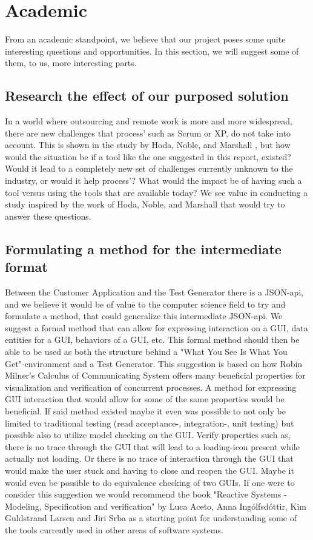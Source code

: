 \section{Academic}
From an academic standpoint, we believe that our project poses some quite interesting questions and opportunities.
In this section, we will suggest some of them, to us, more interesting parts.

\subsection{Research the effect of our purposed solution}
In a world where outsourcing and remote work is more and more widespread, there are new challenges that process' such as Scrum or XP, do not take into account.
This is shown in the study by Hoda, Noble, and Marshall \cite{Hoda2011TheIO}, but how would the situation be if a tool like the one suggested in this report, existed?
Would it lead to a completely new set of challenges currently unknown to the industry, or would it help process'?
What would the impact be of having such a tool versus using the tools that are available today?
We see value in conducting a study inspired by the work of Hoda, Noble, and Marshall that would try to answer these questions.

\subsection{Formulating a method for the intermediate format}
Between the Customer Application and the Test Generator there is a JSON-api, and we believe it would be of value to the computer science field to try and formulate a method, that could generalize this intermediate JSON-api.
We suggest a formal method that can allow for expressing interaction on a GUI, data entities for a GUI, behaviors of a GUI, etc.
This formal method should then be able to be used as both the structure behind a "What You See Is What You Get"-environment and a Test Generator.
This suggestion is based on how Robin Milner's Calculus of Communicating System offers many beneficial properties for visualization and verification of concurrent processes.
A method for expressing GUI interaction that would allow for some of the same properties would be beneficial.
If said method existed maybe it even was possible to not only be limited to traditional testing (read acceptance-, integration-, unit testing) but possible also to utilize model checking on the GUI.
Verify properties such as, there is no trace through the GUI that will lead to a loading-icon present while actually not loading.
Or there is no trace of interaction through the GUI that would make the user stuck and having to close and reopen the GUI.
Maybe it would even be possible to do equivalence checking of two GUIs.
If one were to consider this suggestion we would recommend the book "Reactive Systems - Modeling, Specification and verification" by Luca Aceto, Anna Ingólfsdóttir, Kim Guldstrand Larsen and Jiri Srba as a starting point for understanding some of the tools currently used in other areas of software systems.
